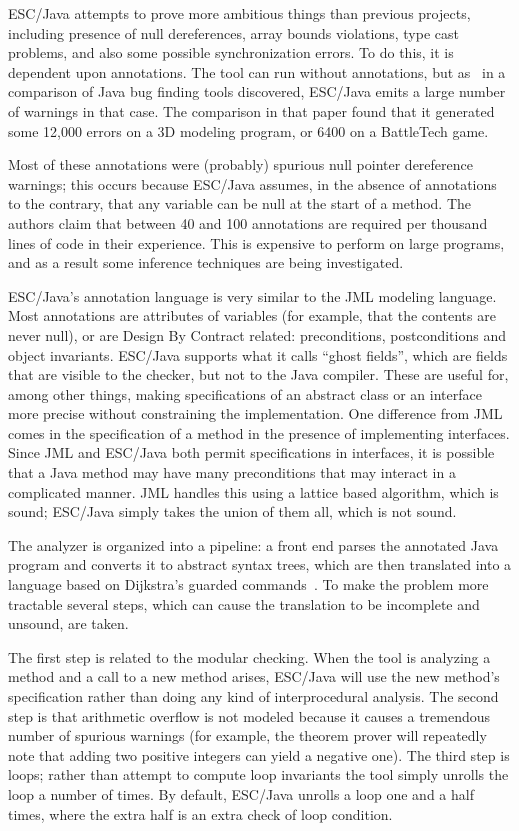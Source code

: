 \documentclass{article}
\begin{document}
\begin{multicols}{2}
ESC/Java attempts to prove more ambitious things than previous
projects, including presence of null dereferences, array bounds
violations, type cast problems, and also some possible synchronization
errors.  To do this, it is dependent upon annotations.  The tool can
run without annotations, but as \cite{rutar04comparison}~in a
comparison of Java bug finding tools discovered, ESC/Java emits a
large number of warnings in that case.  The comparison in that paper
found that it generated some 12,000 errors on a 3D modeling program,
or 6400 on a BattleTech game.

Most of these annotations were (probably) spurious null pointer
dereference warnings; this occurs because ESC/Java assumes, in the
absence of annotations to the contrary, that any variable can be null
at the start of a method.  The authors claim that between 40 and 100
annotations are required per thousand lines of code in their
experience.  This is expensive to perform on large programs, and as a
result some inference techniques are being investigated.

ESC/Java's annotation language is very similar to the JML modeling
language.  Most annotations are attributes of variables (for example,
that the contents are never null), or are Design By Contract related:
preconditions, postconditions and object invariants.  ESC/Java
supports what it calls ``ghost fields'', which are fields that are
visible to the checker, but not to the Java compiler.  These are
useful for, among other things, making specifications of an abstract
class or an interface more precise without constraining the
implementation.  One difference from JML comes in the specification of
a method in the presence of implementing interfaces.  Since JML and
ESC/Java both permit specifications in interfaces, it is possible that
a Java method may have many preconditions that may interact in a
complicated manner.  JML handles this using a lattice based algorithm,
which is sound; ESC/Java simply takes the union of them all, which is
not sound.

The analyzer is organized into a pipeline: a front end parses the
annotated Java program and converts it to abstract syntax trees, which
are then translated into a language based on Dijkstra's guarded
commands~\cite{dijkstra76discipline}.  To make the problem more
tractable several steps, which can cause the translation to be
incomplete and unsound, are taken.

The first step is related to the modular checking.  When the tool is
analyzing a method and a call to a new method arises, ESC/Java will
use the new method's specification rather than doing any kind of
interprocedural analysis.  The second step is that arithmetic overflow
is not modeled because it causes a tremendous number of spurious
warnings (for example, the theorem prover will repeatedly note that
adding two positive integers can yield a negative one).  The third
step is loops; rather than attempt to compute loop invariants the tool
simply unrolls the loop a number of times.  By default, ESC/Java
unrolls a loop one and a half times, where the extra half is an extra
check of loop condition.


\end{multicols}
\end{document}
